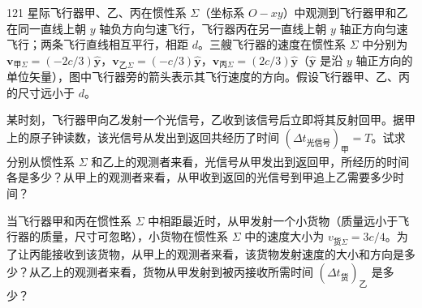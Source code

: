 \begin{problem}[2020第37届全国中学生物理竞赛复赛][星际飞行器相对论通信与货物传输]{121}
    星际飞行器甲、乙、丙在惯性系 $\Sigma$（坐标系 $O-xy$）中观测到飞行器甲和乙在同一直线上朝 $y$ 轴负方向匀速飞行，飞行器丙在另一直线上朝 $y$ 轴正方向匀速飞行；两条飞行直线相互平行，相距 $d$。三艘飞行器的速度在惯性系 $\Sigma$ 中分别为 $\mathbf{v}_{\mathrm{甲}\Sigma} = (-2c/3) \hat{\mathbf{y}}$，$\mathbf{v}_{\mathrm{乙}\Sigma} = (-c/3) \hat{\mathbf{y}}$，$\mathbf{v}_{\mathrm{丙}\Sigma} = (2c/3) \hat{\mathbf{y}}$（$\hat{\mathbf{y}}$ 是沿 $y$ 轴正方向的单位矢量），图中飞行器旁的箭头表示其飞行速度的方向。假设飞行器甲、乙、丙的尺寸远小于 $d$。
    \begin{subproblem}
        某时刻，飞行器甲向乙发射一个光信号，乙收到该信号后立即将其反射回甲。据甲上的原子钟读数，该光信号从发出到返回共经历了时间 $(\Delta t_{\text{光信号}})_{\mathrm{甲}} = T$。试求分别从惯性系 $\Sigma$ 和乙上的观测者来看，光信号从甲发出到返回甲，所经历的时间各是多少？从甲上的观测者来看，从甲收到返回的光信号到甲追上乙需要多少时间？
    \end{subproblem}
    \begin{subproblem}
        当飞行器甲和丙在惯性系 $\Sigma$ 中相距最近时，从甲发射一个小货物（质量远小于飞行器的质量，尺寸可忽略），小货物在惯性系 $\Sigma$ 中的速度大小为 $v_{\mathrm{货}\Sigma} = 3c/4$。为了让丙能接收到该货物，从甲上的观测者来看，该货物发射速度的大小和方向是多少？从乙上的观测者来看，货物从甲发射到被丙接收所需时间 $(\Delta t_{\text{货}})_{\mathrm{乙}}$ 是多少？
    \end{subproblem}
\end{problem}